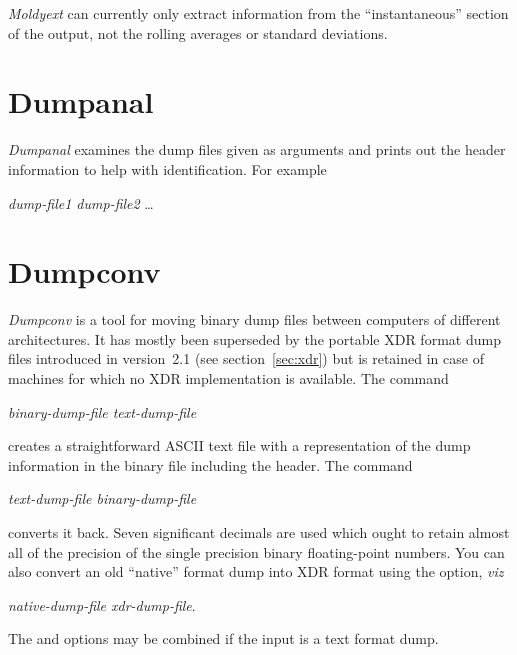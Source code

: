 \documentclass[a4paper,twoside]{report}
\begin{document}
\emph{Moldyext} can currently only extract information from the
``instantaneous'' section of the output, not the rolling averages or
standard deviations.

\section{Dumpanal}%
\emph{Dumpanal} examines the dump files given as arguments and
prints out the header information to help with identification. For
example
\begin{center}
 \textit{dump-file1 dump-file2} \ldots
\end{center}

\section{Dumpconv}%
\label{sec:dumpconv}
\emph{Dumpconv} is a tool for moving binary dump files between
computers of different architectures.  It has mostly been superseded
by the portable XDR format dump files introduced in version~2.1 (see
section~\ref{sec:xdr}) but is retained in case of machines for which
no XDR implementation is available.  The command
\begin{center}
 \textit{binary-dump-file text-dump-file} 
\end{center}
creates a straightforward ASCII text file with a representation of the
dump information in the binary file including the header.  The command
\begin{center}
 \textit{text-dump-file binary-dump-file} 
\end{center}
converts it back.  Seven significant decimals are used which ought to
retain almost all of the precision of the single precision binary
floating-point numbers.  You can also convert an old ``native'' format
dump into XDR format using the  option, \emph{viz}
\begin{center}
 \textit{native-dump-file xdr-dump-file}. 
\end{center}
The  and  options may be combined if the input is a
text format dump.
\end{document}
